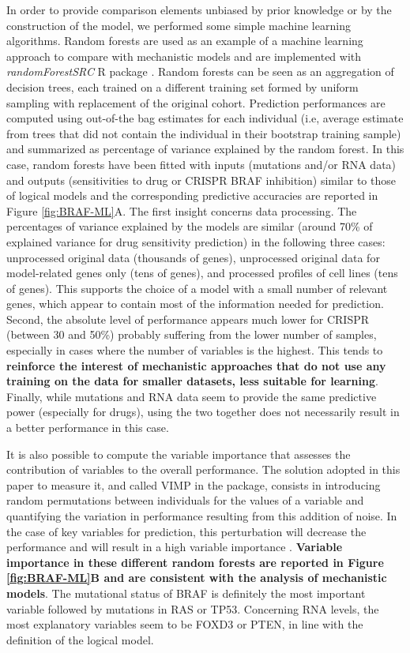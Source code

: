 \documentclass[a4paper,12pt,twoside,onecolumn,openright,final,oldfontcommands]{memoir}
\begin{document}
In order to provide comparison elements unbiased by prior knowledge or
by the construction of the model, we performed some simple machine
learning algorithms. Random forests are used as an example of a machine
learning approach to compare with mechanistic models and are implemented
with \emph{randomForestSRC} R package \citep{breiman2001random}. Random
forests can be seen as an aggregation of decision trees, each trained on
a different training set formed by uniform sampling with replacement of
the original cohort. Prediction performances are computed using
out-of-the bag estimates for each individual (i.e, average estimate from
trees that did not contain the individual in their bootstrap training
sample) and summarized as percentage of variance explained by the random
forest. In this case, random forests have been fitted with inputs
(mutations and/or RNA data) and outputs (sensitivities to drug or CRISPR
BRAF inhibition) similar to those of logical models and the
corresponding predictive accuracies are reported in Figure
\ref{fig:BRAF-ML}A. The first insight concerns data processing. The
percentages of variance explained by the models are similar (around 70\%
of explained variance for drug sensitivity prediction) in the following
three cases: unprocessed original data (thousands of genes), unprocessed
original data for model-related genes only (tens of genes), and
processed profiles of cell lines (tens of genes). This supports the
choice of a model with a small number of relevant genes, which appear to
contain most of the information needed for prediction. Second, the
absolute level of performance appears much lower for CRISPR (between 30
and 50\%) probably suffering from the lower number of samples,
especially in cases where the number of variables is the highest. This
tends to \textbf{reinforce the interest of mechanistic approaches that
do not use any training on the data for smaller datasets, less suitable
for learning}. Finally, while mutations and RNA data seem to provide the
same predictive power (especially for drugs), using the two together
does not necessarily result in a better performance in this case.

It is also possible to compute the variable importance that assesses the
contribution of variables to the overall performance. The solution
adopted in this paper to measure it, and called VIMP in the package,
consists in introducing random permutations between individuals for the
values of a variable and quantifying the variation in performance
resulting from this addition of noise. In the case of key variables for
prediction, this perturbation will decrease the performance and will
result in a high variable importance \citep{ishwaran2007variable}.
\textbf{Variable importance in these different random forests are
reported in Figure \ref{fig:BRAF-ML}B and are consistent with the
analysis of mechanistic models}. The mutational status of BRAF is
definitely the most important variable followed by mutations in RAS or
TP53. Concerning RNA levels, the most explanatory variables seem to be
FOXD3 or PTEN, in line with the definition of the logical model.
\end{document}
